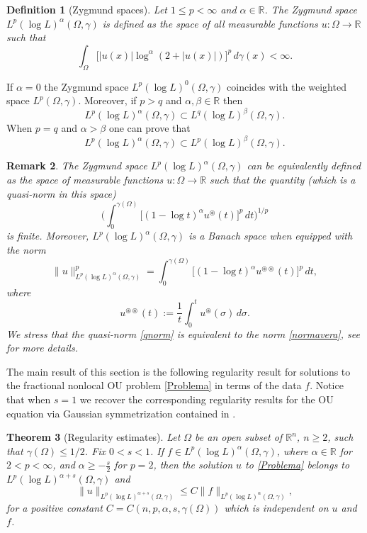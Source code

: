 \documentclass[a4paper,10pt,reqno]{amsart}
\newcommand{\R}{\mathbb{R}}
\newtheorem{theorem}{Theorem}[section]
\newtheorem{remark}[theorem]{Remark}
\newtheorem{definition}[theorem]{Definition}
\numberwithin{equation}{section}
\begin{document}
\begin{definition}[Zygmund spaces]
Let $1\leq p<\infty$ and $\alpha\in\R$. The Zygmund space $L^p(\log L)^\alpha(\Omega,\gamma)$ is defined as the space of all measurable functions $u:\Omega\to\R$ such that
$$\int_\Omega\big[|u(x)|\log^\alpha(2+|u(x)|)\big]^p\,d\gamma(x)<\infty.$$
\end{definition}
If $\alpha=0$ the Zygmund space $L^p(\log L)^0(\Omega,\gamma)$  coincides with the weighted space $L^p(\Omega,\gamma)$. Moreover, if $p>q$ and
$\alpha,\beta\in\R$ then
$$L^p(\log L)^\alpha(\Omega,\gamma)\subset L^q(\log L)^\beta(\Omega,\gamma).$$
When $p=q$ and $\alpha >\beta$ one can prove that
\begin{equation}
L^p(\log L)^\alpha(\Omega,\gamma)\subset L^p(\log L)^\beta(\Omega,\gamma).\label{secondembed}
\end{equation}

\begin{remark}
The Zygmund space $L^p(\log L)^\alpha(\Omega,\gamma)$ can be equivalently defined as the space of measurable functions $u:\Omega\to\R$ such that the quantity (which is a quasi-norm in this space)
\begin{equation}
\bigg(\int_0^{\gamma(\Omega)}\big[(1-\log t)^\alpha
u^{\circledast}(t)\big]^p\,dt\bigg)^{1/p}\label{qnorm}
\end{equation}
is finite. Moreover, $L^p(\log L)^\alpha(\Omega,\gamma)$ is a Banach space when equipped with the norm
\begin{equation}
\|u\|_{L^p(\log L)^\alpha(\Omega,\gamma)}^p=\int_0^{\gamma(\Omega)}\big[(1-\log t)^\alpha
u^{\circledast\circledast}(t)\big]^p\,dt,\label{normavera}
\end{equation}
where
\[
u^{\circledast\circledast}(t):=\frac{1}{t}\int_{0}^{t}u^{\circledast}(\sigma)\,d\sigma.
\]
We stress that the quasi-norm \eqref{qnorm} is equivalent to the norm \eqref{normavera}, see \cite{Bennett} for more details.
\end{remark}

The main result of this section is the following regularity result for solutions to the fractional
nonlocal OU problem \eqref{Problema} in terms of the data $f$.
Notice that when $s=1$ we recover the corresponding regularity results
for the OU equation via Gaussian symmetrization contained in \cite{dFP}.

\begin{theorem}[Regularity estimates]\label{thm:integrability}
Let $\Omega$ be an open subset of $\mathbb{R}^{n}$, $n\geq2$, such that $\gamma(\Omega)\leq1/2$.
Fix $0<s<1$.
If $f\in L^{p}(\log L)^\alpha(\Omega,\gamma)$, where $\alpha\in\R$ for $2< p<\infty$, and $\alpha\geq-\frac{s}{2}$ for $p=2$, then the solution $u$ to
\eqref{Problema} belongs to
$L^{p}(\log L)^{\alpha+s}(\Omega,\gamma)$ and
$$\|u\|_{L^{p}(\log L)^{\alpha+s}(\Omega,\gamma)}\leq C\|f\|_{L^{p}(\log L)^\alpha(\Omega,\gamma)},$$
for a positive constant $C=C(n,p,\alpha,s,\gamma(\Omega))$ which is independent on $u$ and $f$.
\end{theorem}
\end{document}
